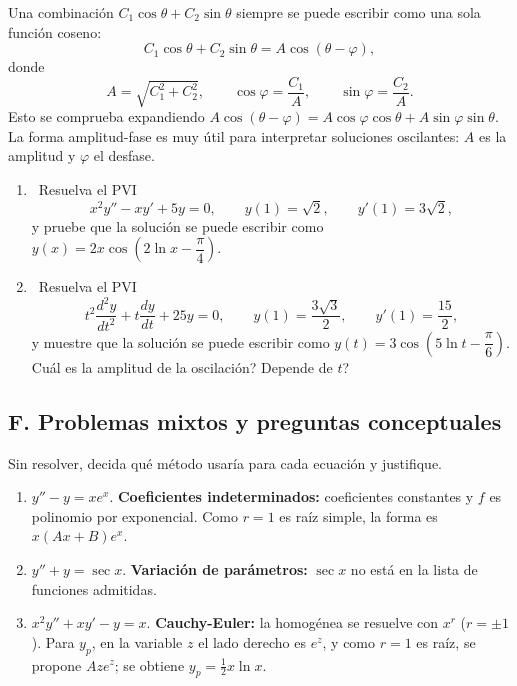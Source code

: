 \begin{remark}
    Una combinaci\'on $C_1\cos\theta+C_2\sin\theta$ siempre se puede escribir como una sola funci\'on coseno:
    \[
    C_1\cos\theta+C_2\sin\theta=A\cos(\theta-\varphi),
    \]
    donde
    \[
    A=\sqrt{C_1^2+C_2^2},\qquad \cos\varphi=\dfrac{C_1}{A},\qquad \sin\varphi=\dfrac{C_2}{A}.
    \]
    Esto se comprueba expandiendo $A\cos(\theta-\varphi)=A\cos\varphi\cos\theta+A\sin\varphi\sin\theta$. La forma amplitud-fase es muy \'util para interpretar soluciones oscilantes: $A$ es la amplitud y $\varphi$ el desfase.
\end{remark}

\begin{enumerate}[label=\textbf{E\arabic*.}, leftmargin=*, resume]
    \item \medio\ Resuelva el PVI
    \[
    x^2y''-xy'+5y=0,\qquad y(1)=\sqrt2,\qquad y'(1)=3\sqrt2,
    \]
    y pruebe que la soluci\'on se puede escribir como $y(x)=2x\cos\left(2\ln x-\dfrac{\pi}{4}\right)$.
    \item \medio\ Resuelva el PVI
    \[
    t^2\dfrac{d^2y}{dt^2}+t\dfrac{dy}{dt}+25y=0,\qquad y(1)=\dfrac{3\sqrt3}{2},\qquad y'(1)=\dfrac{15}{2},
    \]
    y muestre que la soluci\'on se puede escribir como $y(t)=3\cos\left(5\ln t-\dfrac{\pi}{6}\right)$. \textquestiondown Cu\'al es la amplitud de la oscilaci\'on? \textquestiondown Depende de $t$?
\end{enumerate}

\subsection*{F. Problemas mixtos y preguntas conceptuales}

\begin{example}
    Sin resolver, decida qu\'e m\'etodo usar\'ia para cada ecuaci\'on y justifique.
    \begin{enumerate}[label=\alph*)]
        \item $y''-y=xe^x$. \textbf{Coeficientes indeterminados:} coeficientes constantes y $f$ es polinomio por exponencial. Como $r=1$ es ra\'iz simple, la forma es $x(Ax+B)e^x$.
        \item $y''+y=\sec x$. \textbf{Variaci\'on de par\'ametros:} $\sec x$ no est\'a en la lista de funciones admitidas.
        \item $x^2y''+xy'-y=x$. \textbf{Cauchy-Euler:} la homog\'enea se resuelve con $x^r$ ($r=\pm1$). Para $y_p$, en la variable $z$ el lado derecho es $e^z$, y como $r=1$ es ra\'iz, se propone $Aze^z$; se obtiene $y_p=\frac12x\ln x$.
    \end{enumerate}
\end{example}

